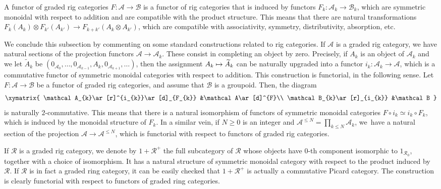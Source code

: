 \documentclass[JEP,XML,SOM,Unicode,published]{cedram}
\newcommand\mto{\mathchoice{\longmapsto}{\mapsto}{\mapsto}{\mapsto}}
\theoremstyle{plain}
\theoremstyle{definition}
\newcommand{\Acal}{\mathcal A}
\newcommand{\Bcal}{\mathcal B}
\newcommand{\Rcal}{\mathcal R}
\begin{document}
A functor of graded rig categories $F\colon\Acal\to\Bcal$ is a functor of rig categories that is induced by functors $F_{k}\colon \Acal_{k}\to\Bcal_{k}$, which are symmetric monoidal with respect to addition and are compatible with the product structure. This means that there are natural transformations $F_{k}(A_{k})\otimes F_{k'}(A_{k'})\to F_{k+k'}(A_{k}\otimes A_{k'})$, which are compatible with associativity, symmetry, distributivity, absorption, etc.

We conclude this subsection by commenting on some standard constructions related to rig categories. If $\Acal$ is a graded rig category, we have natural sections of the projection functors $\Acal\to\Acal_{k}$. These consist in completing an object by zero. Precisely, if $A_{k}$ is an object of $\Acal_{k}$ and we let $\widetilde{A}_{k}$ be $(0_{\Acal_{0}},\ldots, 0_{\Acal_{k-1}},A_{k},0_{\Acal_{k+1}},\ldots)$, then the assignment $A_{k}\mto\widetilde{A}_{k}$ can be naturally upgraded into a functor $i_{k}\colon\Acal_{k}\to\Acal$, which is a commutative functor of symmetric monoidal categories with respect to addition. This construction is functorial, in the following sense. Let $F\colon\Acal\to\Bcal$ be a functor of graded rig categories, and assume that $\Bcal$ is a groupoid. Then, the diagram
\begin{displaymath}
\xymatrix{
\Acal_{k}\ar[r]^{i_{k}}\ar[d]_{F_{k}} &\Acal\ar[d]^{F}\\
\Bcal_{k}\ar[r]_{i_{k}} &\Bcal
}
\end{displaymath}
is naturally $2$-commutative. This means that there is a natural isomorphism of functors of symmetric monoidal categories $F\circ i_{k}\simeq i_{k}\circ F_{k}$, which is induced by the monoidal structure of $F_{k}$. In a similar vein, if $N\geq 0$ is an integer and $\Acal^{\leq N}=\prod_{k\leq N}\Acal_{k}$, we~have a natural section of the projection $\Acal\to\Acal^{\leq N}$, which is functorial with respect to functors of graded rig categories.

If $\Rcal$ is a graded rig category, we denote by $1+\Rcal^{+}$ the full subcategory of $\Rcal$ whose objects have $0$-th component isomorphic to $1_{\Rcal_{0}}$, together with a choice of isomorphism. It has a natural structure of symmetric monoidal category with respect to the product induced by $\Rcal$. If $\Rcal$ is in fact a graded ring category, it can be easily checked that $1+\Rcal^{+}$ is actually a commutative Picard category. The construction is clearly functorial with respect to functors of graded ring categories.
\end{document}
